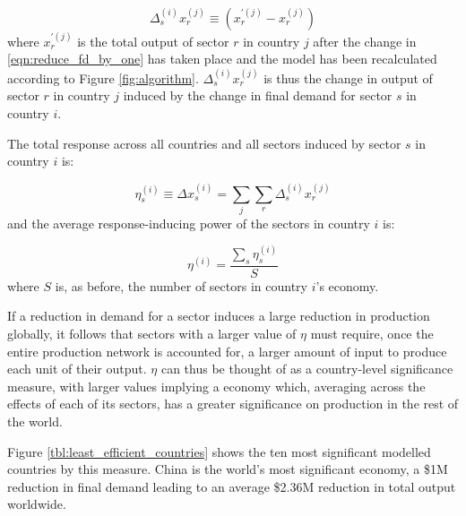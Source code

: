 \documentclass[a4paper]{article}
\begin{document}
\begin{equation}
    \Delta_{s}^{(i)} x_{r}^{(j)} \equiv (x_{r}^{\prime(j)} - x_r^{(j)})
\end{equation}
where $x_{r}^{\prime(j)}$ is the total output of sector $r$ in country $j$ after the change in \cref{eqn:reduce_fd_by_one} has taken place and the model has been recalculated according to Figure \ref{fig:algorithm}.
$\Delta_{s}^{(i)} x_{r}^{(j)}$ is thus the change in output of sector $r$ in country $j$ induced by the change in final demand for sector $s$ in country $i$.

The total response across all countries and all sectors induced by sector $s$ in country $i$ is:

\begin{equation}
    \eta_s^{(i)} \equiv \Delta x_{s}^{(i)} = \sum_j \sum_r \Delta_{s}^{(i)} x_{r}^{(j)}
\end{equation}
and the average response-inducing power of the sectors in country $i$ is:

\begin{equation}
    \eta^{(i)} = \frac{\sum_s \eta_s^{(i)}}{S}
\end{equation}
where $S$ is, as before, the number of sectors in country $i$'s economy.

If a reduction in demand for a sector induces a large reduction in production globally, it follows that sectors with a larger value of $\eta$ must require, once the entire production network is accounted for, a larger amount of input to produce each unit of their output.
$\eta$ can thus be thought of as a country-level significance measure, with larger values implying a economy which, averaging across the effects of each of its sectors, has a greater significance on production in the rest of the world.

Figure \ref{tbl:least_efficient_countries} shows the ten most significant modelled countries by this measure.
China is the world's most significant economy, a \$1M reduction in final demand leading to an average \$2.36M reduction in total output worldwide.
\end{document}
